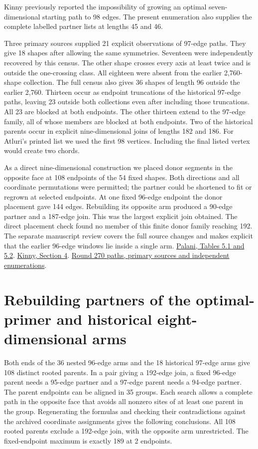 \documentclass[11pt,a4paper]{article}
\theoremstyle{definition}
\theoremstyle{remark}
\begin{document}
Kinny previously reported the impossibility of growing an optimal
seven-dimensional starting path to 98 edges. The present enumeration
also supplies the complete labelled partner lists at lengths 45 and 46.

Three primary sources supplied 21 explicit observations of 97-edge
paths. They give 18 shapes after allowing the same symmetries.
Seventeen were independently recovered by this census. The other
shape crosses every axis at least twice and is outside the
one-crossing class. All eighteen were absent from the earlier
2,760-shape collection. The full census also gives 36 shapes
of length 96 outside the earlier 2,760. Thirteen occur as endpoint
truncations of the historical 97-edge paths, leaving 23 outside both
collections even after including those truncations. All 23 are blocked at both endpoints.
The other thirteen extend to the 97-edge family, all of whose
members are blocked at both endpoints.
Two of the historical parents occur in explicit nine-dimensional joins
of lengths 182 and 186. For Atluri's printed list we used the first
98 vertices. Including the final listed vertex would create two chords.

As a direct nine-dimensional construction we placed donor segments
in the opposite face at 108 endpoints of the 54 fixed shapes.
Both directions and all coordinate permutations were permitted; the
partner could be shortened to fit or regrown at selected endpoints.
At one fixed 96-edge endpoint the donor placement gave 144 edges.
Rebuilding its opposite arm produced a 90-edge partner and a
187-edge join. This was the largest explicit join obtained. The direct placement
check found no member of this finite donor family reaching 192.
The separate manuscript review covers the full source changes and
makes explicit that the earlier 96-edge windows lie inside a single arm.
\href{https://ai.uga.edu/sites/default/files/inline-files/theses/palani_ananta.pdf}{Palani, Tables 5.1 and 5.2}. \href{https://ebooks.iospress.nl/pdf/doi/10.3233/978-1-61499-098-7-462}{Kinny, Section 4}. \href{https://github.com/hironaka-iori/Snake-in-the-box-in-9/tree/main/milestones/270-optimal-seven-dimensional-arms}{Round 270 paths, primary sources and independent enumerations}.

\section{Rebuilding partners of the optimal-primer and historical eight-dimensional arms}
Both ends of the 36 nested 96-edge arms and the 18 historical 97-edge
arms give 108 distinct rooted parents. In a pair giving a 192-edge
join, a fixed 96-edge parent needs a 95-edge partner and a 97-edge
parent needs a 94-edge partner. The parent endpoints can be aligned
in 35 groups. Each search allows a complete path in the opposite face
that avoids all nonzero sites of at least one parent in the group.
Regenerating the formulas and checking their contradictions against
the archived coordinate assignments gives the following conclusions.
All 108 rooted parents exclude a 192-edge join, with the opposite arm unrestricted. The fixed-endpoint maximum is exactly 189 at 2 endpoints.
\end{document}

